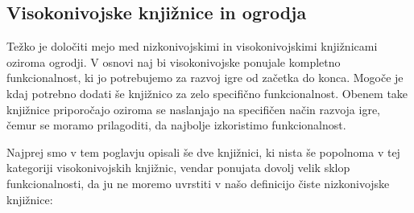 \documentclass[12pt,a4paper,twoside]{book}
\begin{document}
\subsection{Visokonivojske knjižnice in ogrodja}
Težko je določiti mejo med nizkonivojskimi in visokonivojskimi knjižnicami oziroma ogrodji. V osnovi naj bi visokonivojske ponujale kompletno funkcionalnost, ki jo potrebujemo za razvoj igre od začetka do konca. Mogoče je kdaj potrebno dodati še knjižnico za zelo specifično funkcionalnost. Obenem take knjižnice priporočajo oziroma se naslanjajo na specifičen način razvoja igre, čemur se moramo prilagoditi, da najbolje izkoristimo funkcionalnost. 

Najprej smo v tem poglavju opisali še dve knjižnici, ki nista še popolnoma v tej kategoriji visokonivojskih knjižnic, vendar ponujata dovolj velik sklop funkcionalnosti, da ju ne moremo uvrstiti v našo definicijo čiste nizkonivojske knjižnice:
\end{document}
